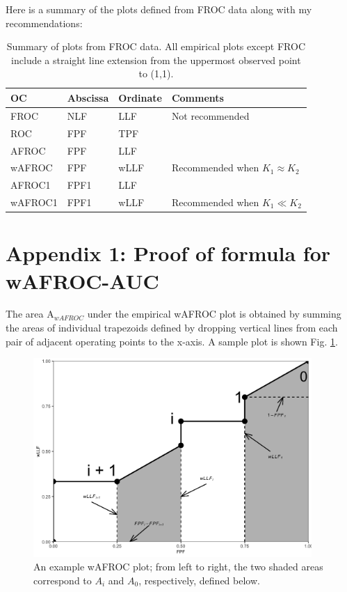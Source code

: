 \documentclass[
]{book}
\begin{document}
Here is a summary of the plots defined from FROC data along with my recommendations:

\begin{table}

\caption{\label{tab:empirical-summary}Summary of plots from FROC data. All empirical plots except FROC include a straight line extension from the uppermost observed point to (1,1).}
\centering
\begin{tabular}[t]{l|l|l|l}
\hline
OC & Abscissa & Ordinate & Comments\\
\hline
FROC & NLF & LLF & Not recommended\\
\hline
ROC & FPF & TPF & \\
\hline
AFROC & FPF & LLF & \\
\hline
wAFROC & FPF & wLLF & Recommended when $K_1 \approx K_2$\\
\hline
AFROC1 & FPF1 & LLF & \\
\hline
wAFROC1 & FPF1 & wLLF & Recommended when $K_1 \ll K_2$\\
\hline
\end{tabular}
\end{table}

\hypertarget{empirical-theorem-1}{%
\section{Appendix 1: Proof of formula for wAFROC-AUC}\label{empirical-theorem-1}}

The area \(\text{A}_{wAFROC}\) under the empirical wAFROC plot is obtained by summing the areas of individual trapezoids defined by dropping vertical lines from each pair of adjacent operating points to the x-axis. A sample plot is shown Fig. \ref{fig:empirical-theorems}.

\begin{figure}

{\centering \includegraphics[width=300pt]{images/03-empiricalPlots/proofFigure} 

}

\caption{An example wAFROC plot; from left to right, the two shaded areas correspond to $A_i$ and  $A_0$, respectively, defined below.}\label{fig:empirical-theorems}
\end{figure}
\end{document}
